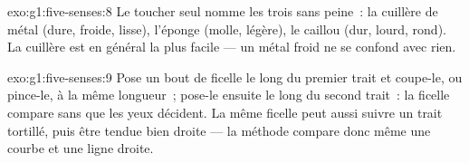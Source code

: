 \begin{solution}{exo:g1:five-senses:8}
Le toucher seul nomme les trois sans peine~: la cuillère de métal
(dure, froide, lisse), l'éponge (molle, légère), le caillou (dur,
lourd, rond). La cuillère est en général la plus facile --- un métal
froid ne se confond avec rien.
\end{solution}

\begin{solution}{exo:g1:five-senses:9}
Pose un bout de ficelle le long du premier trait et coupe-le, ou
pince-le, à la même longueur~; pose-le ensuite le long du second
trait~: la ficelle compare sans que les yeux décident. La même
ficelle peut aussi suivre un trait tortillé, puis être tendue bien
droite --- la méthode compare donc même une courbe et une ligne
droite.
\end{solution}

